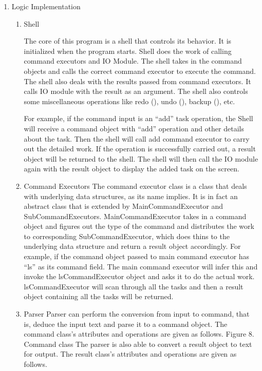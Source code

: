 \documentclass[12pt, a4paper]{article}
\begin{document}
\begin{enumerate}

\item Logic Implementation
\begin{enumerate}
\item Shell

The core of this program is a shell that controls its behavior. It is initialized when the
program starts. Shell does the work of calling command executors and IO Module. The
shell takes in the command objects and calls the correct command executor to execute
the command. The shell also deals with the results passed from command executors. It
calls IO module with the result as an argument. The shell also controls some
miscellaneous operations like redo (), undo (), backup (), etc.

For example, if the command input is an “add” task operation, the Shell will receive a
command object with “add” operation and other details about the task. Then the shell
will call add command executor to carry out the detailed work. If the operation is
successfully carried out, a result object will be returned to the shell. The shell will then
call the IO module again with the result object to display the added task on the screen.
\item Command Executors
The command executor class is a class that deals with underlying data structures, as its
name implies. It is in fact an abstract class that is extended by MainCommandExecutor
and SubCommandExecutors. MainCommandExecutor takes in a command object and
figures out the type of the command and distributes the work to corresponding
SubCommandExecutor, which does thins to the underlying data structure and return a
result object accordingly.
For example, if the command object passed to main command executor has “ls” as its
command field. The main command executor will infer this and invoke the
lsCommandExecutor object and asks it to do the actual work. lsCommandExecutor will
scan through all the tasks and then a result object containing all the tasks will be
returned.
\item Parser
Parser can perform the conversion from input to command, that is, deduce the input text
and parse it to a command object. The command class’s attributes and operations are
given as follows.
Figure 8. Command class
The parser is also able to convert a result object to text for output. The result class’s
attributes and operations are given as follows.


\end{enumerate}
\end{enumerate}
\end{document}
